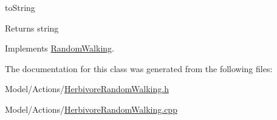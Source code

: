 to\+String \begin{DoxyReturn}{Returns}
string 
\end{DoxyReturn}


Implements \hyperlink{class_random_walking_a86f089cc5cc28d179e248c67477e8b30}{Random\+Walking}.



The documentation for this class was generated from the following files\+:\begin{DoxyCompactItemize}
\item 
Model/\+Actions/\hyperlink{_herbivore_random_walking_8h}{Herbivore\+Random\+Walking.\+h}\item 
Model/\+Actions/\hyperlink{_herbivore_random_walking_8cpp}{Herbivore\+Random\+Walking.\+cpp}\end{DoxyCompactItemize}
